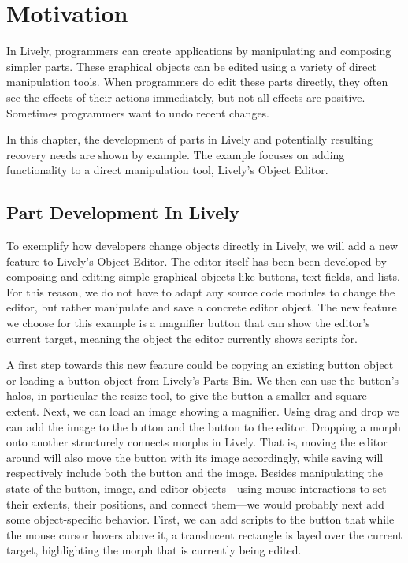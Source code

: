 \chapter{Motivation} \label{chapter:MOTIVATION}

In Lively, programmers can create applications by manipulating and composing simpler parts.
These graphical objects can be edited using a variety of direct manipulation tools.
When programmers do edit these parts directly, they often see the effects of their actions immediately, but not all effects are positive.
Sometimes programmers want to undo recent changes.

In this chapter, the development of parts in Lively and potentially resulting recovery needs are shown by example.
The example focuses on adding functionality to a direct manipulation tool, Lively's Object Editor.



\section{Part Development In Lively}

To exemplify how developers change objects directly in Lively, we will add a new feature to Lively's Object Editor.
The editor itself has been been developed by composing and editing simple graphical objects like buttons, text fields, and lists.
For this reason, we do not have to adapt any source code modules to change the editor, but rather manipulate and save a concrete editor object.
The new feature we choose for this example is a magnifier button that can show the editor's current target, meaning the object the editor currently shows scripts for.

A first step towards this new feature could be copying an existing button object or loading a button object from Lively's Parts Bin.
We then can use the button's halos, in particular the resize tool, to give the button a smaller and square extent.
Next, we can load an image showing a magnifier.
Using drag and drop we can add the image to the button and the button to the editor.
Dropping a morph onto another structurely connects morphs in Lively.
That is, moving the editor around will also move the button with its image accordingly, while saving will respectively include both the button and the image.
Besides manipulating the state of the button, image, and editor objects---using mouse interactions to set their extents, their positions, and connect them---we would probably next add some object-specific behavior.
First, we can add scripts to the button that while the mouse cursor hovers above it, a translucent rectangle is layed over the current target, highlighting the morph that is currently being edited.

